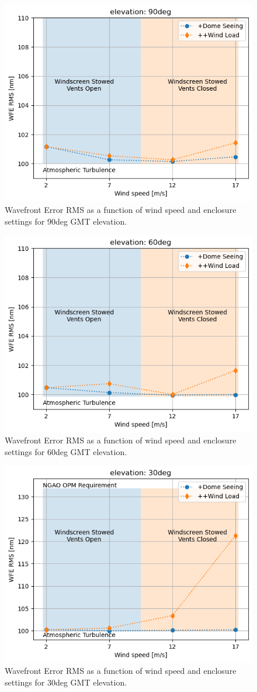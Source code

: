 \documentclass[]{AO4ELT}  %
\begin{document}
\begin{figure}
   \centering
   \includegraphics[width=0.5\linewidth]{./figures/wfe-rms_el90.png}
   \caption{Wavefront Error RMS as a function of wind speed and enclosure settings for 90deg GMT elevation.}
   \label{fig:18a}
\end{figure}

\begin{figure}
   \centering
   \includegraphics[width=0.5\linewidth]{./figures/wfe-rms_el60.png}
   \caption{Wavefront Error RMS as a function of wind speed and enclosure settings for 60deg GMT elevation.}
   \label{fig:18b}
\end{figure}

\begin{figure}
   \centering
   \includegraphics[width=0.5\linewidth]{./figures/wfe-rms_el30.png}
   \caption{Wavefront Error RMS as a function of wind speed and enclosure settings for 30deg GMT elevation.}
   \label{fig:18c}
\end{figure}
\end{document}
